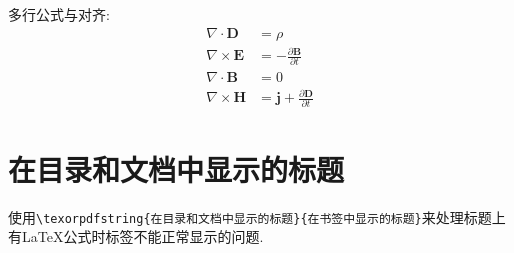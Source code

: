 \documentclass{ctexart}
\newcommand*{\bv}{\boldsymbol} %
\newcommand*{\pdiff}[2]{\frac{\partial #1}{\partial #2}} %
\newcommand*{\diff}[2]{\frac{\mathrm{d} #1}{\mathrm{d} #2}} %
\begin{document}
多行公式与对齐:
\begin{align}
	\nabla\cdot \bv D &= \rho
	\\
	\nabla \times \bv E & =  - \pdiff{\bv B}{t}
	\\
	\nabla \cdot \bv B &= 0
	\\
	\nabla \times \bv H &= \bv j + \pdiff{\bv D}{t}
\end{align}

\section{\texorpdfstring{在目录和文档中显示的标题}{在书签中显示的标题}}

使用\verb|\texorpdfstring{在目录和文档中显示的标题}{在书签中显示的标题}|来处理标题上有\LaTeX{}公式时标签不能正常显示的问题.

\nocite{*} %
\printbibliography[heading=bibnumbered, title={参考文献}]
\end{document}
